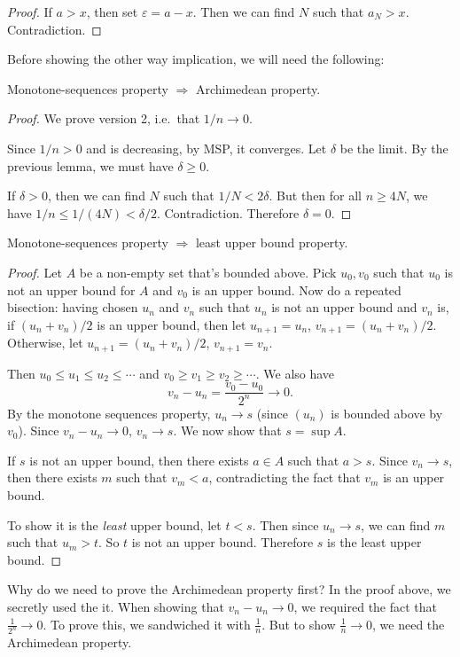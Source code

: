 \documentclass[a4paper]{article}
\begin{document}
\begin{proof}
  If $a > x$, then set $\varepsilon = a - x$. Then we can find $N$ such that $a_N > x$. Contradiction.
\end{proof}

Before showing the other way implication, we will need the following:
\begin{lemma}
  Monotone-sequences property $\Rightarrow$ Archimedean property.
\end{lemma}

\begin{proof}
  We prove version 2, i.e.\ that $1/n \to 0$.

  Since $1/n > 0$ and is decreasing, by MSP, it converges. Let $\delta$ be the limit. By the previous lemma, we must have $\delta \geq 0$.

  If $\delta > 0$, then we can find $N$ such that $1/N < 2\delta$. But then for all $n \geq 4N$, we have $1/n \leq 1/(4N) < \delta/2$. Contradiction. Therefore $\delta = 0$.
\end{proof}

\begin{lemma}
  Monotone-sequences property $\Rightarrow$ least upper bound property.
\end{lemma}

\begin{proof}
  Let $A$ be a non-empty set that's bounded above. Pick $u_0, v_0$ such that $u_0$ is not an upper bound for $A$ and $v_0$ is an upper bound. Now do a repeated bisection: having chosen $u_n$ and $v_n$ such that $u_n$ is not an upper bound and $v_n$ is, if $(u_n + v_n)/2$ is an upper bound, then let $u_{n + 1} = u_n$, $v_{n + 1} = (u_n + v_n)/2$. Otherwise, let $u_{n + 1} = (u_n + v_n)/2$, $v_{n + 1} = v_n$.

  Then $u_0 \leq u_1 \leq u_2 \leq \cdots$ and $v_0\geq v_1 \geq v_2 \geq \cdots$. We also have
  \[
    v_n - u_n = \frac{v_0 - u_0}{2^n} \to 0.
  \]
  By the monotone sequences property, $u_n\to s$ (since $(u_n)$ is bounded above by $v_0$). Since $v_n - u_n \to 0$, $v_n \to s$. We now show that $s = \sup A$.

  If $s$ is not an upper bound, then there exists $a\in A$ such that $a > s$. Since $v_n \to s$, then there exists $m$ such that $v_m < a$, contradicting the fact that $v_m$ is an upper bound.

  To show it is the \emph{least} upper bound, let $t < s$. Then since $u_n \to s$, we can find $m$ such that $u_m > t$. So $t$ is not an upper bound. Therefore $s$ is the least upper bound.
\end{proof}
Why do we need to prove the Archimedean property first? In the proof above, we secretly used the it. When showing that $v_n - u_n \to 0$, we required the fact that $\frac{1}{2^n} \to 0$. To prove this, we sandwiched it with $\frac{1}{n}$. But to show $\frac{1}{n}\to 0$, we need the Archimedean property.
\end{document}
